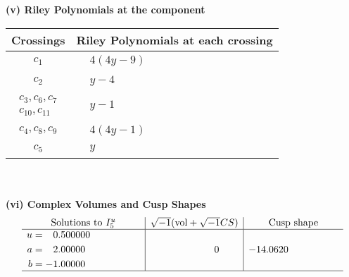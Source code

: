 \documentclass[1p]{elsarticle_modified}
\theoremstyle{definition}
\newcommand{\I}{\sqrt{-1}}
\begin{document}
\newpage\renewcommand{\arraystretch}{1}
\flushleft \textbf{(v) Riley Polynomials at the component}\newline \\
\begin{tabular}{m{50pt}|m{274pt}}
Crossings & \hspace{64pt}Riley Polynomials at each crossing \\
\hline $$\begin{aligned}c_{1}\end{aligned}$$&$\begin{aligned}
&4(4 y-9)
\end{aligned}$\\
\hline $$\begin{aligned}c_{2}\end{aligned}$$&$\begin{aligned}
&y-4
\end{aligned}$\\
\hline $$\begin{aligned}c_{3},c_{6},c_{7}\\c_{10},c_{11}\end{aligned}$$&$\begin{aligned}
&y-1
\end{aligned}$\\
\hline $$\begin{aligned}c_{4},c_{8},c_{9}\end{aligned}$$&$\begin{aligned}
&4(4 y-1)
\end{aligned}$\\
\hline $$\begin{aligned}c_{5}\end{aligned}$$&$\begin{aligned}
&y
\end{aligned}$\\
\hline
\end{tabular}\\~\\
\newpage\flushleft \textbf{(vi) Complex Volumes and Cusp Shapes}
$$\begin{array}{c|c|c}  
\text{Solutions to }I^u_{5}& \I (\text{vol} + \sqrt{-1}CS) & \text{Cusp shape}\\
 \hline 
\begin{aligned}
u &= \phantom{-}0.500000\phantom{ +0.000000I} \\
a &= \phantom{-}2.00000\phantom{ +0.000000I} \\
b &= -1.00000\phantom{ +0.000000I}\end{aligned}
 & \phantom{-0.000000 } 0 & -14.0620\phantom{ +0.000000I}\\
 \hline 
 \end{array}$$\newpage\newpage\renewcommand{\arraystretch}{1}
\end{document}
